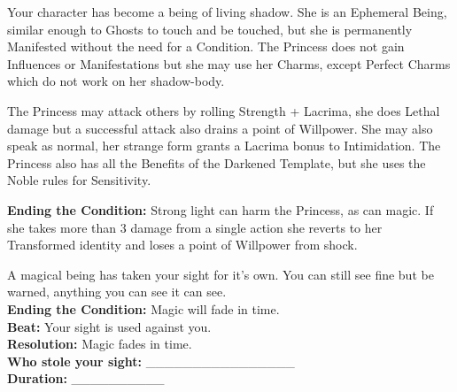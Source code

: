 \documentclass[10pt, frontgrid, backgrid]{flacards}
\begin{document}
{Your character has become a being of living shadow. She is an Ephemeral Being, similar enough to Ghosts to touch and be touched, but she is permanently Manifested without the need for a Condition. The Princess does not gain Influences or Manifestations but she may use her Charms, except Perfect Charms which do not work on her shadow-body.

The Princess may attack others by rolling Strength + Lacrima, she does Lethal damage but a successful attack also drains a point of Willpower. She may also speak as normal, her strange form grants a Lacrima bonus to Intimidation. The Princess also has all the Benefits of the Darkened Template, but she uses the Noble rules for Sensitivity. 

\textbf{Ending the Condition:} Strong light can harm the Princess, as can magic. If she takes more than 3 damage from a single action she reverts to her Transformed identity and loses a point of Willpower from shock. }

{A magical being has taken your sight for it's own. You can still see fine but be warned, anything you can see it can see. \\
\textbf{Ending the Condition:} Magic will fade in time. \\
\textbf{Beat:} Your sight is used against you.\\
\textbf{Resolution:} Magic fades in time.\\
\textbf{Who stole your sight:} \_\_\_\_\_\_\_\_\_\_\_\_\_\_\_\_ \\
\textbf{Duration:} \_\_\_\_\_\_\_\_\_\_ }
\end{document}
